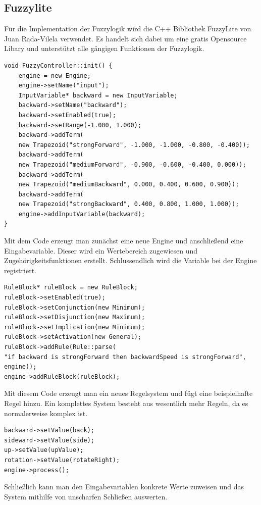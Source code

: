 \subsection{Fuzzylite}
Für die Implementation der Fuzzylogik wird die C++ Bibliothek FuzzyLite von Juan Rada-Vilela verwendet. Es handelt sich dabei um eine gratis Opensource Libary und unterstützt alle gängigen Funktionen der Fuzzylogik.\cite{fuzzylite}  
\begin{lstlisting}[caption=Beispielcode zur Erzeugung eines neuen Fuzzymodells]
void FuzzyController::init() {
	engine = new Engine;
	engine->setName("input");
	InputVariable* backward = new InputVariable;
	backward->setName("backward");
	backward->setEnabled(true);
	backward->setRange(-1.000, 1.000);
	backward->addTerm(
	new Trapezoid("strongForward", -1.000, -1.000, -0.800, -0.400));
	backward->addTerm(
	new Trapezoid("mediumForward", -0.900, -0.600, -0.400, 0.000));
	backward->addTerm(
	new Trapezoid("mediumBackward", 0.000, 0.400, 0.600, 0.900));
	backward->addTerm(
	new Trapezoid("strongBackward", 0.400, 0.800, 1.000, 1.000));
	engine->addInputVariable(backward);
}
\end{lstlisting}
Mit dem Code erzeugt man zunächst eine neue Engine und anschließend eine Eingabevariable. Dieser wird ein Wertebereich zugewiesen und Zugehörigkeitsfunktionen erstellt. Schlussendlich wird die Variable bei der Engine registriert. 
\begin{lstlisting}[caption=Code zur Erzeugung von einem Regelsystem]
RuleBlock* ruleBlock = new RuleBlock;
ruleBlock->setEnabled(true);
ruleBlock->setConjunction(new Minimum);
ruleBlock->setDisjunction(new Maximum);
ruleBlock->setImplication(new Minimum);
ruleBlock->setActivation(new General);
ruleBlock->addRule(Rule::parse(
"if backward is strongForward then backwardSpeed is strongForward",
engine));
engine->addRuleBlock(ruleBlock);
\end{lstlisting}
Mit diesem Code erzeugt man ein neues Regelsystem und fügt eine beispielhafte Regel hinzu. Ein komplettes System besteht aus wesentlich mehr Regeln, da es normalerweise komplex ist.
\begin{lstlisting}[caption=Code zur Auswertung des Regelsystems]
backward->setValue(back);
sideward->setValue(side);
up->setValue(upValue);
rotation->setValue(rotateRight);
engine->process();
\end{lstlisting}
Schließlich kann man den Eingabevariablen konkrete Werte zuweisen und das System mithilfe von unscharfen Schließen auswerten.
